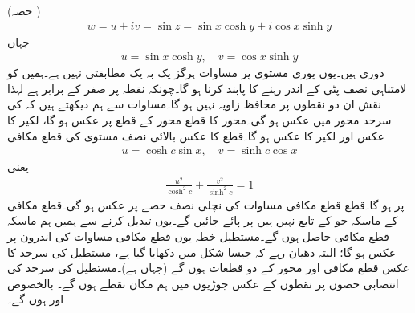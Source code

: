  (حصہ ) 
\begin{align}\label{مساوات_محافظ_سائن_الف}
w=u+iv=\sin z=\sin x\cosh y+i\cos x\sinh y
\end{align}
جہاں
\begin{align}\label{مساوات_محافظ_سائن_ب}
u=\sin x\cosh y,\quad v=\cos x\sinh y
\end{align}
دوری ہیں۔یوں پوری  مستوی پر مساوات  ہرگز یک بہ یک مطابقتی نہیں ہے۔ہمیں  کو لامتناہی نصف پٹی
  کے اندر رہنے کا پابند کرنا ہو گا۔چونکہ  نقطہ  پر صفر کے برابر ہے لہٰذا نقش ان دو نقطوں پر محافظ زاویہ نہیں ہو گا۔مساوات  سے ہم دیکھتے ہیں کہ  کی سرحد  محور   میں  عکس  ہو گی۔محور  کا قطع  محور  کے قطع   پر عکس ہو گا، لکیر  کا عکس  اور  لکیر   کا عکس  ہو گا۔قطع  کا عکس بالائی نصف  مستوی کی قطع مکافی
\begin{align*}
u=\cosh c\sin x,\quad v=\sinh c\cos x
\end{align*}
یعنی
\begin{align}\label{مساوات_نقش_قطع_مکافی}
\frac{u^2}{\cosh^2 c}+\frac{v^2}{\sinh^2 c}=1
\end{align}
پر ہو گا۔قطع    قطع مکافی مساوات  کی نچلی نصف حصے پر عکس ہو گی۔قطع مکافی کے ماسکہ  جو  کے تابع نہیں ہیں  پر پائے جائیں گے۔یوں  تبدیل کرنے سے ہمیں ہم ماسکہ قطع مکافی حاصل ہوں گے۔مستطیل خطہ   یوں قطع مکافی مساوات  کی اندرون پر عکس ہو گا؛ البتہ دھیان رہے کہ جیسا شکل  میں دکھایا گیا ہے، مستطیل کی سرحد کا عکس قطع مکافی اور محور     کے دو قطعات ہوں گے (جہاں  ہے)۔مستطیل کی سرحد کی  انتصابی حصوں پر نقطوں کے عکس جوڑیوں میں ہم مکان نقطے ہوں گے۔  بالخصوص  اور  ہوں گے۔
